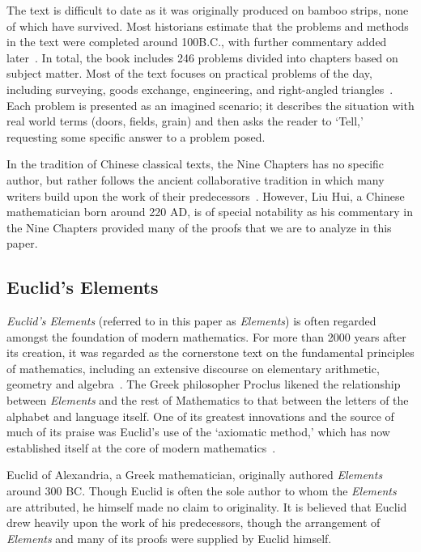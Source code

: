 \documentclass[12pt]{article}
\begin{document}
The text is difficult to date as it was
originally produced on bamboo strips, none of
which have survived. Most historians estimate that
the problems and methods in the text were
completed around 100B.C., with further
commentary added later~\cite{Chemla}.
In total, the book includes 246 problems divided
into chapters based on subject matter. Most of the
text focuses on practical problems of the day,
including surveying, goods exchange, engineering,
and right-angled triangles~\cite{O'Connor}.
Each problem is presented as an imagined
scenario; it describes the situation with real world
terms (doors, fields, grain) and then asks the reader
to `Tell,’ requesting some specific answer to a
problem posed.

In the tradition of Chinese classical texts, the
Nine Chapters has no specific author, but rather
follows the ancient collaborative tradition in which
many writers build upon the work of their
predecessors~\cite{Boyer}. However, Liu Hui, a
Chinese mathematician born around 220 AD, is of
special notability as his commentary in the Nine
Chapters provided many of the proofs that we are
to analyze in this paper.

\subsection{Euclid's Elements}

\emph{Euclid’s Elements} (referred to in this paper as
\emph{Elements}) is often regarded amongst the foundation of
modern mathematics. For more than 2000 years
after its creation, it was regarded as the cornerstone
text on the fundamental principles of mathematics,
including an extensive discourse on elementary
arithmetic, geometry and algebra~\cite{Boyer}. The
Greek philosopher Proclus likened the relationship
between \emph{Elements} and the rest of Mathematics to
that between the letters of the alphabet and
language itself. One of its greatest innovations and
the source of much of its praise was Euclid’s use of
the `axiomatic method,' which has now established
itself at the core of modern mathematics~\cite{Mueller}.

Euclid of Alexandria, a Greek mathematician,
originally authored \emph{Elements} around 300 BC.
Though Euclid is often the sole author to whom the
\emph{Elements} are attributed, he himself made no claim
to originality. It is believed that Euclid drew heavily
upon the work of his predecessors, though the
arrangement of \emph{Elements} and many of its proofs
were supplied by Euclid himself.
\end{document}
